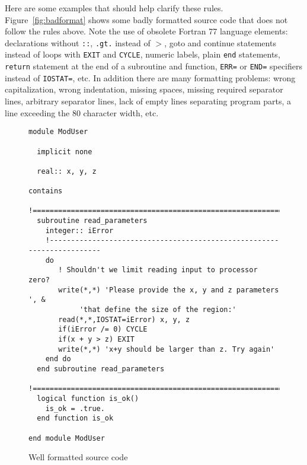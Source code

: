 \documentclass{article}
\begin{document}
Here are some examples that should help clarify these rules. 
Figure~\ref{fig:badformat} shows some badly formatted source 
code that does not follow the rules above.
Note the use of obsolete Fortran 77 language elements:
declarations without {\tt ::}, {\tt .gt.} instead of $>$, 
{goto} and {continue} statements instead of loops with 
{\tt EXIT} and {\tt CYCLE}, 
numeric labels, plain {\tt end} statements, 
{\tt return} statement at the end of a subroutine and
function, {\tt ERR=} or {\tt END=} specifiers instead of {\tt IOSTAT=}, etc.
In addition there are many formatting problems:
wrong capitalization, wrong indentation, missing spaces, missing
required separator lines, arbitrary separator lines,
lack of empty lines separating program parts, a line
exceeding the 80 character width, etc.

\begin{figure}
\begin{verbatim}
module ModUser

  implicit none

  real:: x, y, z

contains
  !=========================================================================
  subroutine read_parameters 
    integer:: iError
    !-----------------------------------------------------------------------
    do
       ! Shouldn't we limit reading input to processor zero?
       write(*,*) 'Please provide the x, y and z parameters ', &
            'that define the size of the region:'
       read(*,*,IOSTAT=iError) x, y, z
       if(iError /= 0) CYCLE
       if(x + y > z) EXIT
       write(*,*) 'x+y should be larger than z. Try again'
    end do
  end subroutine read_parameters
  !=========================================================================
  logical function is_ok()
    is_ok = .true.
  end function is_ok

end module ModUser
\end{verbatim}
\caption{Well formatted source code}
\label{fig:goodformat}
\end{figure}
\end{document}
